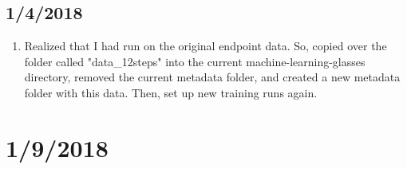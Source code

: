 \documentclass[12pt,reqno]{amsart}
\numberwithin{equation}{section}
\begin{document}
\subsection{1/4/2018}
\begin{enumerate}
\item Realized that I had run on the original endpoint data.  So, copied over the folder called "data\_12steps" into the current machine-learning-glasses directory, removed the current metadata folder, and created a new metadata folder with this data.  Then, set up new training runs again.      

\end{enumerate}

\section{1/9/2018}
\end{document}

